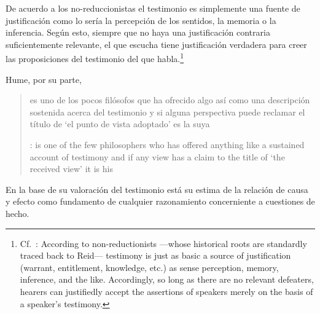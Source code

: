 De acuerdo a los no-reduccionistas el testimonio es simplemente una fuente de
justificación como lo sería la percepción de los sentidos, la memoria o la
inferencia. Según esto, siempre que no haya una justificación contraria
suficientemente relevante, el que escucha tiene justificación verdadera para
creer las proposiciones del testimonio del que
habla.\footnote{Cf.~\cite[4]{lackeysosa2006eptest}: According to
  non-reductionists ---whose historical roots are standardly traced back to
  Reid--- testimony is just as basic a source of justification (warrant,
  entitlement, knowledge, etc.) as sense perception, memory, inference, and the
  like. Accordingly, so long as there are no relevant defeaters, hearers can
  justifiedly accept the assertions of speakers merely on the basis of a
  speaker's testimony.}

Hume, por su parte, \blockquote[{\cite[79]{coady1992test}}: is one of the few
philosophers who has offered anything like a sustained account of testimony and
if any view has a claim to the title of `the received view' it is his]{es uno de
  los pocos filósofos que ha ofrecido algo así como una descripción sostenida
  acerca del testimonio y si alguna perspectiva puede reclamar el título de `el
  punto de vista adoptado' es la suya}. En la base de su valoración del
testimonio está su estima de la relación de causa y efecto como fundamento de
cualquier razonamiento concerniente a cuestiones de hecho.

